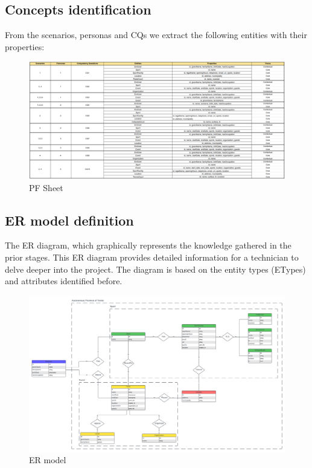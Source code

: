 \subsection{Concepts identification}
From the scenarios, personas and CQs we extract the following entities with their properties:
\begin{figure}[H]
    \centering
    \includegraphics[width=1\linewidth]{knowdive-files/PFSheet.png}
    \caption{PF Sheet}
    \label{fig:concepts_identification}
\end{figure}

\subsection{ER model definition}
The ER diagram, which graphically represents the knowledge gathered in the prior stages. This ER diagram provides detailed information for a technician to delve deeper into the project. The diagram is based on the entity types (ETypes) and attributes identified before.
\begin{figure}[H]
    \centering
    \includegraphics[width=1\linewidth]{knowdive-files/ER_model.png}
    \caption{ER model}
    \label{fig:er_model}
\end{figure}

